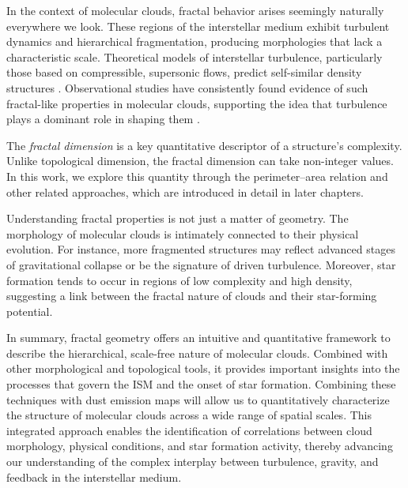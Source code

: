 In the context of molecular clouds, fractal behavior arises seemingly naturally everywhere we look. These regions of the interstellar medium exhibit turbulent dynamics and hierarchical fragmentation, producing morphologies that lack a characteristic scale. Theoretical models of interstellar turbulence, particularly those based on compressible, supersonic flows, predict self-similar density structures \cite{kolmogorov1962refinement}. Observational studies have consistently found evidence of such fractal-like properties in molecular clouds, supporting the idea that turbulence plays a dominant role in shaping them \cite{elmegreen1996fractal, falgarone1991hierarchical}.

The \emph{fractal dimension} is a key quantitative descriptor of a structure's complexity.  Unlike topological dimension, the fractal dimension can take non-integer values. In this work, we explore this quantity through the perimeter–area relation and other related approaches, which are introduced in detail in later chapters.

Understanding fractal properties is not just a matter of geometry. The morphology of molecular clouds is intimately connected to their physical evolution. For instance, more fragmented structures may reflect advanced stages of gravitational collapse or be the signature of driven turbulence. Moreover, star formation tends to occur in regions of low complexity and high density, suggesting a link between the fractal nature of clouds and their star-forming potential.

In summary, fractal geometry offers an intuitive and quantitative framework to describe the hierarchical, scale-free nature of molecular clouds. Combined with other morphological and topological tools, it provides important insights into the processes that govern the ISM and the onset of star formation. Combining these techniques with dust emission maps will allow us to quantitatively characterize the structure of molecular clouds across a wide range of spatial scales. This integrated approach enables the identification of correlations between cloud morphology, physical conditions, and star formation activity, thereby advancing our understanding of the complex interplay between turbulence, gravity, and feedback in the interstellar medium.